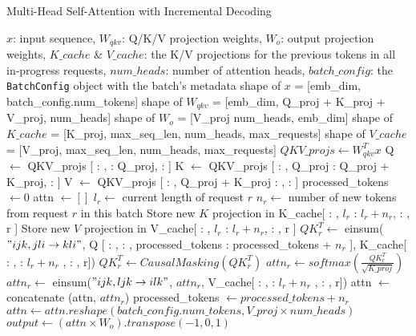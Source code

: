 \begin{algorithm}[H]
  \caption{Multi-Head Self-Attention with Incremental Decoding}
  \label{alg:attn2}
  \small
  \begin{algorithmic}[1]
    \Ensure $x$: input sequence, $W_{qkv}$: Q/K/V projection weights, $W_{o}$: output projection weights, $K\_cache$ \& $V\_cache$: the K/V projections for the previous tokens in all in-progress requests, $num\_heads$: number of attention heads, $batch\_config$: the \texttt{BatchConfig} object with the batch's metadata
    \Require shape of $x$ = [emb\_dim, batch\_config.num\_tokens]
    \Require shape of $W_{qkv}$ = [emb\_dim, Q\_proj + K\_proj + V\_proj, num\_heads]
    \Require shape of $W_{o}$ = [V\_proj \times num\_heads, emb\_dim]
    \Require shape of $K\_cache$ = [K\_proj, max\_seq\_len, num\_heads, max\_requests]
    \Require shape of $V\_cache$ = [V\_proj, max\_seq\_len, num\_heads, max\_requests]
    \State $QKV\_projs \leftarrow W_{qkv}^Tx$
    \State Q $\leftarrow$ QKV\_projs [ : , : Q\_proj, : ]
    \State K $\leftarrow$ QKV\_projs [ : , Q\_proj : Q\_proj + K\_proj, : ]
    \State V $\leftarrow$ QKV\_projs  [ : , Q\_proj + K\_proj : , : ]
    \State processed\_tokens $\leftarrow 0$
    \State attn $\leftarrow []$
        \State $l_r \leftarrow$ current length of request $r$
        \State $n_r \leftarrow$ number of new tokens from request $r$ in this batch
        \State Store new $K$ projection in K\_cache[ : , $l_r$ : $l_r + n_r$, : , r ]
        \State Store new $V$ projection in V\_cache[ : , $l_r$ : $l_r + n_r$, : , r ]
        \State $QK^T_r \leftarrow$ einsum($"ijk,jli\rightarrow kli"$, Q [ : , : , processed\_tokens : processed\_tokens + $n_r$ ], K\_cache[ : , : $l_r + n_r$ , : , r])
        \State $QK^T_r \leftarrow CausalMasking(QK^T_r)$
        \State $attn_r \leftarrow softmax\left(\frac{QK^T_r}{\sqrt{K\_proj}}\right)$
        \State $attn_r \leftarrow$ einsum($"ijk,ljk \rightarrow ilk"$, $attn_r$, V\_cache[ : , : $l_r + n_r$ , : , r])
        \State attn $\leftarrow$ concatenate (attn, $attn_r$)
        \State processed\_tokens $\leftarrow processed\_tokens + n_r$
    \EndFor
    \State $attn \leftarrow attn.reshape(batch\_config.num\_tokens, V\_proj \times num\_heads)$
    \State $output \leftarrow (attn \times W_{o}).transpose(-1,0,1)$
  \end{algorithmic}
\end{algorithm}

